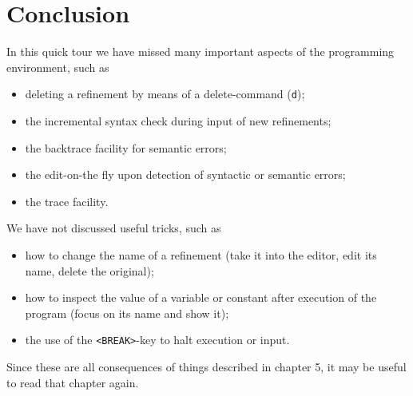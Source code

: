 \section{Conclusion}

In this quick tour we have missed many important aspects of
the programming environment, such as

\begin{itemize}
\item deleting a refinement by means of a delete-command ({\tt d});
\item the incremental syntax check during input of new refinements;
\item the backtrace facility for semantic errors;
\item the edit-on-the fly upon detection of syntactic or semantic errors;
\item the trace facility.
\end{itemize}

\noindent
We have not discussed useful tricks, such as

\begin{itemize}
\item how to change the name of a refinement (take it into the
editor, edit its name, delete the original);
\item how to inspect the value of a variable or constant after
execution of the program (focus on its name and show it);
\item the use of the {\tt <BREAK>}-key to halt execution or input.
\end{itemize}

\noindent
Since these are all consequences of things described in chapter
5, it may be useful to read that chapter again.

